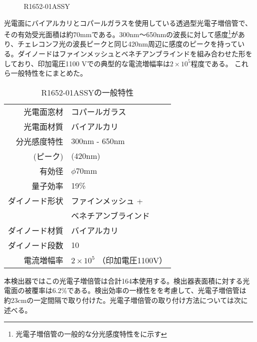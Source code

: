 \begin{figure}[htbp]
  \begin{minipage}{0.47\textwidth}
  \end{minipage}
  \hfill
  \begin{minipage}{0.47\textwidth}
  \end{minipage}
    \caption{R1652-01ASSY}
  \label{LGPMT}
\end{figure}

光電面にバイアルカリとコパールガラスを使用している透過型光電子増倍管で、その有効受光面積は約70mmである。300nm〜650nmの波長に対して感度\footnote{光電子増倍管の一般的な分光感度特性をに示す}があり、チェレコンフ光の波長ピークと同じ420nm周辺に感度のピークを持っている。ダイノードはファインメッシュとベネチアンブラインドを組み合わせた形をしており、印加電圧1100 Vでの典型的な電流増幅率は$2 \times 10^{5}$程度である。
これら一般特性をにまとめた。

\begin{table}[htbp]
\caption[R1652-01ASSYの一般特性]{R1652-01ASSYの一般特性}
\begin{center}
\begin{tabular}{rl}
\hline \hline
光電面窓材 & コパールガラス \\
光電面材質 & バイアルカリ \\
分光感度特性 & 300nm - 650nm \\
(ピーク) & (420nm) \\
有効径 & $\phi$70mm \\
量子効率 & 19\% \\
ダイノード形状 & ファインメッシュ +\\
 & ベネチアンブラインド \\
ダイノード材質 & バイアルカリ \\
ダイノード段数 & 10 \\
電流増幅率 & $ 2 \times 10^{5}$ （印加電圧1100V）\\
\hline \hline
\end{tabular}
\end{center}
\label{R1652-spec}
\end{table}%

本検出器ではこの光電子増倍管は合計164本使用する。検出器表面積に対する光電面の被覆率は6.2\%である。検出効率の一様性をを考慮して、光電子増倍管は約23cmの一定間隔で取り付けた。光電子増倍管の取り付け方法については次に述べる。

